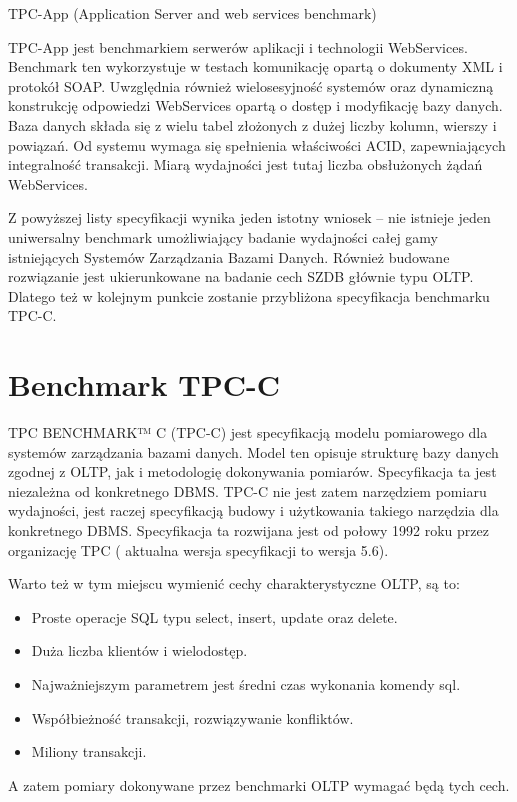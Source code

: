 TPC-App (Application Server and web services benchmark)

TPC-App jest benchmarkiem serwerów aplikacji i technologii WebServices. Benchmark ten wykorzystuje w testach
komunikację opartą o dokumenty XML i protokół SOAP. Uwzględnia również wielosesyjność systemów oraz
dynamiczną konstrukcję odpowiedzi WebServices opartą o dostęp i modyfikację bazy danych. Baza danych składa się z
wielu tabel złożonych z dużej liczby kolumn, wierszy i powiązań. Od systemu wymaga się spełnienia właściwości ACID,
zapewniających integralność transakcji. Miarą wydajności jest tutaj liczba obsłużonych
żądań WebServices.

Z powyższej listy specyfikacji wynika jeden istotny wniosek -- nie istnieje 
jeden uniwersalny benchmark umożliwiający badanie wydajności całej gamy istniejących
Systemów Zarządzania Bazami Danych. Również budowane rozwiązanie jest ukierunkowane
na badanie cech SZDB głównie typu OLTP. Dlatego też w kolejnym punkcie zostanie
przybliżona specyfikacja benchmarku TPC-C.

\section{Benchmark TPC-C}

TPC BENCHMARK™ C (TPC-C) jest specyfikacją modelu pomiarowego dla systemów zarządzania bazami danych. 
Model ten opisuje strukturę bazy danych zgodnej z OLTP, jak i metodologię dokonywania pomiarów.
Specyfikacja ta jest niezależna od konkretnego DBMS. TPC-C nie jest zatem narzędziem pomiaru wydajności,
jest raczej specyfikacją budowy i użytkowania takiego narzędzia dla konkretnego DBMS. Specyfikacja 
ta rozwijana jest od połowy 1992 roku przez organizację TPC ( aktualna wersja specyfikacji to wersja 5.6).

Warto też w tym miejscu wymienić cechy charakterystyczne OLTP, są to:
\begin{itemize}
\item Proste operacje SQL typu select, insert, update oraz delete.
\item Duża liczba klientów i wielodostęp.
\item Najważniejszym parametrem jest średni czas wykonania komendy sql.
\item Współbieżność transakcji, rozwiązywanie konfliktów.
\item Miliony transakcji.
\end{itemize}

A zatem pomiary dokonywane przez benchmarki OLTP wymagać będą tych cech.

